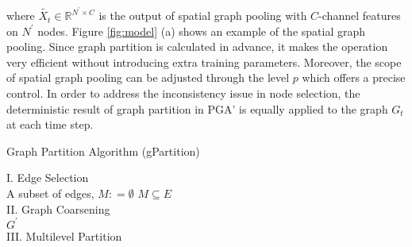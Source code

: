 \documentclass[sigconf,screen]{acmart}
\begin{document}
where $\widetilde{X_t} \in \mathbb{R}^{N^{\prime} \times C}$ is the output of spatial graph pooling with $C$-channel features on $N^{\prime}$ nodes. Figure \ref{fig:model} (a) shows an example of the spatial graph pooling. Since graph partition is calculated in advance, it makes the operation very efficient without introducing extra training parameters. Moreover, the scope of spatial graph pooling can be adjusted through the level $p$ which offers a precise control. In order to address the inconsistency issue in node selection, the deterministic result of graph partition in PGA' is equally applied to the graph $G_t$ at each time step.
\begin{algorithm}
\caption{\label{alg:pga} Graph Partition Algorithm (gPartition)} 


\nonl I. Edge Selection\\
A subset of edges, $M : = \emptyset$\;
\Return $M \subseteq E$\\
\nonl II. Graph Coarsening\\
\Return $G^{\prime} $ \label{alg:loop}\\
\nonl III. Multilevel Partition\\
\end{algorithm}
\end{document}
